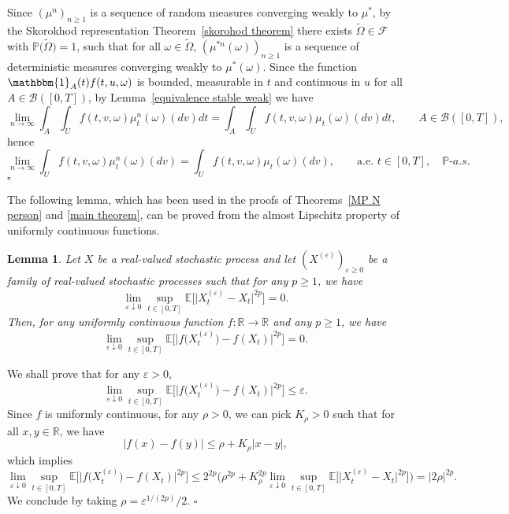 \documentclass[12pt]{article}
\newtheorem{lemma}[prop]{Lemma}
\theoremstyle{named}
\numberwithin{equation}{section}
\newcommand{\abs}[1]{\lvert#1\rvert}
\def\P{{\mathord{\mathbb P}}}
\newenvironment{Proof}{\removelastskip\par\medskip \noindent{\em Proof.} \rm}{\penalty-20\null\hfill$\square$\par\medbreak}
\begin{document}
\begin{Proof}
    Since $( \mu^n )_{ n \geq 1 }$ is a sequence of random measures converging weakly to $\mu^*$, by the Skorokhod representation Theorem~\ref{skorohod theorem} there exists
  $\widetilde{\Omega}\in\mathcal{F}$ with $\P \big(\widetilde{\Omega}\big) = 1$, such that
    for all $\omega \in \widetilde{\Omega}$, $( \mu^{*n}(\omega) )_{ n \geq 1 }$ is a sequence of deterministic measures converging weakly to $\mu^*(\omega)$.
    Since the function $\mathbbm{1}_A(t)f(t,u,\omega)$ is bounded,
measurable in $t$ and continuous in $u$
for all $A \in \mathcal{B}([0,T])$,
by Lemma~\ref{equivalence stable weak} we have
\[
\lim_{n\to \infty}
\int_A \int_{U} f(t,v,\omega) \mu^n_t(\omega)(dv)dt
=
\int_A \int_{U} f(t,v,\omega) \mu_t(\omega)(dv)dt,
\qquad A \in \mathcal{B}([0,T]),
\]
 hence
\[
\lim_{n\to \infty}
\int_{U} f(t,v,\omega) \mu^n_t(\omega)(dv) =
 \int_{U} f(t,v,\omega) \mu_t(\omega)(dv), \qquad \text{a.e. } t \in [0,T], \quad \P\mbox{-}a.s.
\]
\end{Proof}
\noindent
The following lemma,
which has been used in the proofs of
Theorems~\ref{MP N person} and \ref{main theorem},
can be proved from the almost Lipschitz property of
 uniformly continuous functions.
\begin{lemma}\label{lemma: uniform and lipschitz}
  Let $X$ be a real-valued stochastic process and let
   $(X^{(\varepsilon)})_{\varepsilon \geq 0}$ be a family of real-valued stochastic processes such that for any $p \geq 1$, we have
\[
\lim\limits_{\varepsilon \downarrow 0} \sup\limits_{t \in [0,T]} \mathbb{E} \big[\big| X^{(\varepsilon)}_t - X_t\big|^{2p} ] = 0.
\]
Then, for any uniformly continuous function $f:\mathbb{R} \to \mathbb{R}$ and any $p \geq 1$, we have
\[
\lim\limits_{\varepsilon \downarrow 0} \sup\limits_{t \in [0,T]} \mathbb{E}\big[\big|f\big(X^{(\varepsilon)}_t\big) - f(X_t)\big|^{2p}] = 0.
\]
\end{lemma}
\begin{Proof}
We shall prove that for any $\varepsilon > 0$,
\[
\lim\limits_{\varepsilon \downarrow 0} \sup\limits_{t \in [0,T]} \mathbb{E}\big[\big|f\big(X^{(\varepsilon)}_t\big) - f(X_t)\big|^{2p}\big] \leq \varepsilon.
\]
 Since $f$ is uniformly continuous, for any $\rho > 0$, we can pick $K_{\rho} > 0$ such that for all $x, y \in \mathbb{R}$, we have
\[
\abs{f(x) - f(y)} \leq \rho + K_{\rho} \abs{x-y},
\]
which implies
\[
\lim\limits_{\varepsilon \downarrow 0} \sup\limits_{t \in [0,T]} \mathbb{E}\big[\big|f\big(X^{(\varepsilon)}_t\big) - f(X_t)\big|^{2p}\big] \leq 2^{2p} \big(\rho^{2p} + K_{\rho}^{2p} \lim\limits_{\varepsilon \downarrow 0} \sup\limits_{t \in [0,T]}\mathbb{E} \big[\big|X^{(\varepsilon)}_t - X_t\big|^{2p} \big]\big) = |2\rho|^{2p}.
\]
We conclude by taking $\rho = \varepsilon^{1/(2p)}/2$.
\end{Proof}
\end{document}
